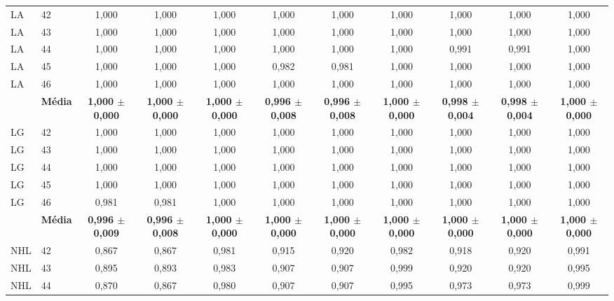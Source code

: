 \begin{table}[H]
{\begin{tabular}{llccccccccc}
\midrule
LA & 42 & 1{,}000 & 1{,}000 & 1{,}000 & 1{,}000 & 1{,}000 & 1{,}000 & 1{,}000 & 1{,}000 & 1{,}000 \\
LA & 43 & 1{,}000 & 1{,}000 & 1{,}000 & 1{,}000 & 1{,}000 & 1{,}000 & 1{,}000 & 1{,}000 & 1{,}000 \\
LA & 44 & 1{,}000 & 1{,}000 & 1{,}000 & 1{,}000 & 1{,}000 & 1{,}000 & 0{,}991 & 0{,}991 & 1{,}000 \\
LA & 45 & 1{,}000 & 1{,}000 & 1{,}000 & 0{,}982 & 0{,}981 & 1{,}000 & 1{,}000 & 1{,}000 & 1{,}000 \\
LA & 46 & 1{,}000 & 1{,}000 & 1{,}000 & 1{,}000 & 1{,}000 & 1{,}000 & 1{,}000 & 1{,}000 & 1{,}000 \\
\cmidrule(lr){2-11}
& \textbf{Média} & \textbf{1{,}000 $\pm$ 0{,}000} & \textbf{1{,}000 $\pm$ 0{,}000} & \textbf{1{,}000 $\pm$ 0{,}000} & \textbf{0{,}996 $\pm$ 0{,}008} & \textbf{0{,}996 $\pm$ 0{,}008} & \textbf{1{,}000 $\pm$ 0{,}000} & \textbf{0{,}998 $\pm$ 0{,}004} & \textbf{0{,}998 $\pm$ 0{,}004} & \textbf{1{,}000 $\pm$ 0{,}000} \\
\midrule
LG & 42 & 1{,}000 & 1{,}000 & 1{,}000 & 1{,}000 & 1{,}000 & 1{,}000 & 1{,}000 & 1{,}000 & 1{,}000 \\
LG & 43 & 1{,}000 & 1{,}000 & 1{,}000 & 1{,}000 & 1{,}000 & 1{,}000 & 1{,}000 & 1{,}000 & 1{,}000 \\
LG & 44 & 1{,}000 & 1{,}000 & 1{,}000 & 1{,}000 & 1{,}000 & 1{,}000 & 1{,}000 & 1{,}000 & 1{,}000 \\
LG & 45 & 1{,}000 & 1{,}000 & 1{,}000 & 1{,}000 & 1{,}000 & 1{,}000 & 1{,}000 & 1{,}000 & 1{,}000 \\
LG & 46 & 0{,}981 & 0{,}981 & 1{,}000 & 1{,}000 & 1{,}000 & 1{,}000 & 1{,}000 & 1{,}000 & 1{,}000 \\
\cmidrule(lr){2-11}
& \textbf{Média} & \textbf{0{,}996 $\pm$ 0{,}009} & \textbf{0{,}996 $\pm$ 0{,}008} & \textbf{1{,}000 $\pm$ 0{,}000} & \textbf{1{,}000 $\pm$ 0{,}000} & \textbf{1{,}000 $\pm$ 0{,}000} & \textbf{1{,}000 $\pm$ 0{,}000} & \textbf{1{,}000 $\pm$ 0{,}000} & \textbf{1{,}000 $\pm$ 0{,}000} & \textbf{1{,}000 $\pm$ 0{,}000} \\
\midrule
NHL & 42 & 0{,}867 & 0{,}867 & 0{,}981 & 0{,}915 & 0{,}920 & 0{,}982 & 0{,}918 & 0{,}920 & 0{,}991 \\
NHL & 43 & 0{,}895 & 0{,}893 & 0{,}983 & 0{,}907 & 0{,}907 & 0{,}999 & 0{,}920 & 0{,}920 & 0{,}995 \\
NHL & 44 & 0{,}870 & 0{,}867 & 0{,}980 & 0{,}907 & 0{,}907 & 0{,}995 & 0{,}973 & 0{,}973 & 0{,}999 \\

\end{tabular}}
\end{table}
